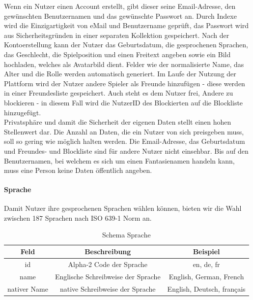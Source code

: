 Wenn ein Nutzer einen Account erstellt, gibt dieser seine Email-Adresse, den gewünschten Benutzernamen und das gewünschte Passwort an. 
Durch Indexe wird die Einzigartigkeit von eMail und Benutzername geprüft, das Passwort wird aus Sicherheitsgründen in einer separaten Kollektion gespeichert.
Nach der Kontoerstellung kann der Nutzer das Geburtsdatum, die gesprochenen Sprachen, das Geschlecht, die Spielposition und einen Freitext angeben sowie ein Bild hochladen, welches als Avatarbild dient.
Felder wie der normalisierte Name, das Alter und die Rolle werden automatisch generiert.
Im Laufe der Nutzung der Plattform wird der Nutzer andere Spieler als Freunde hinzufügen - diese werden in einer Freundesliste gespeichert.
Auch steht es dem Nutzer frei, Andere zu blockieren - in diesem Fall wird die NutzerID des Blockierten auf die Blockliste hinzugefügt. \\
Privatsphäre und damit die Sicherheit der eigenen Daten stellt einen hohen Stellenwert dar.
Die Anzahl an Daten, die ein Nutzer von sich preisgeben muss, soll so gering wie möglich halten werden.
Die Email-Adresse, das Geburtsdatum und Freundes- und Blockliste sind für andere Nutzer nicht einsehbar.
Bis auf den Benutzernamen, bei welchem es sich um einen Fantasienamen handeln kann, muss eine Person keine Daten öffentlich angeben.

\paragraph{Sprache\\}
Damit Nutzer ihre gesprochenen Sprachen wählen können, bieten wir die Wahl zwischen 187 Sprachen nach ISO 639-1 Norm an.\cite{db:iso639-1}\\

\begin{table}
    \centering
    \begin{tabular}{ |c|c|c| }
    \hline
        Feld & Beschreibung & Beispiel \\
        \hline
        id & Alpha-2 Code der Sprache & en, de, fr \\
        name & Englische Schreibweise der Sprache & English, German, French \\
        nativer Name & native Schreibweise der Sprache & English, Deutsch, français \\
        \hline
    \end{tabular}
    \caption{Schema Sprache}
    \label{db:table:sprache}
\end{table}

